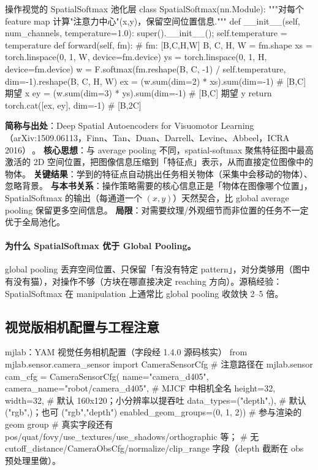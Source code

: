 \begin{codebox}[Python]{操作视觉的 SpatialSoftmax 池化层}
class SpatialSoftmax(nn.Module):
    """对每个 feature map 计算"注意力中心"(x,y)，保留空间位置信息."""
    def __init__(self, num_channels, temperature=1.0):
        super().__init__(); self.temperature = temperature
    def forward(self, fm):                      # fm: [B,C,H,W]
        B, C, H, W = fm.shape
        xs = torch.linspace(0, 1, W, device=fm.device)
        ys = torch.linspace(0, 1, H, device=fm.device)
        w = F.softmax(fm.reshape(B, C, -1) / self.temperature, dim=-1).reshape(B, C, H, W)
        ex = (w.sum(dim=2) * xs).sum(dim=-1)    # [B,C] 期望 x
        ey = (w.sum(dim=3) * ys).sum(dim=-1)    # [B,C] 期望 y
        return torch.cat([ex, ey], dim=-1)      # [B,2C]
\end{codebox}

\begin{paper}\label{paper:rlmc-manip-ssm}
\textbf{简称与出处}：Deep Spatial Autoencoders for Visuomotor Learning（arXiv:1509.06113，Finn、Tan、Duan、Darrell、Levine、Abbeel，ICRA 2016）\,\cite{finn2016dsae}。
\textbf{核心思想}：与 average pooling 不同，spatial-softmax 聚焦特征图中最高激活的 2D 空间位置，把图像信息压缩到「特征点」表示，从而直接定位图像中的物体。
\textbf{关键结果}：学到的特征点自动挑出任务相关物体（采集中会移动的物体）、忽略背景。
\textbf{与本书关系}：操作策略需要的核心信息正是「物体在图像哪个位置」，SpatialSoftmax 的输出（每通道一个 $(x,y)$）天然契合，比 global average pooling 保留更多空间信息。
\textbf{局限}：对需要纹理/外观细节而非位置的任务不一定优于全局池化。
\end{paper}

\paragraph{为什么 SpatialSoftmax 优于 Global Pooling。}global pooling 丢弃空间位置、只保留「有没有特定 pattern」，对分类够用（图中有没有猫），对操作不够（方块在哪直接决定 reaching 方向）。源稿经验：SpatialSoftmax 在 manipulation 上通常比 global pooling 收敛快 2--5 倍。

\subsection{视觉版相机配置与工程注意}
\label{sec:rlmc-manip-camcfg}

\begin{codebox}[Python]{mjlab：YAM 视觉任务相机配置（字段经 1.4.0 源码核实）}
from mjlab.sensor.camera_sensor import CameraSensorCfg  # 注意路径在 mjlab.sensor
cam_cfg = CameraSensorCfg(
    name="camera_d405", camera_name="robot/camera_d405",  # MJCF 中相机全名
    height=32, width=32,            # 默认 160x120；小分辨率以提吞吐
    data_types=("depth",),          # 默认 ("rgb",)；也可 ("rgb","depth")
    enabled_geom_groups=(0, 1, 2))  # 参与渲染的 geom group
# 真实字段还有 pos/quat/fovy/use_textures/use_shadows/orthographic 等；
# 无 cutoff_distance/CameraObsCfg/normalize/clip_range 字段（depth 截断在 obs 预处理里做）。
\end{codebox}

